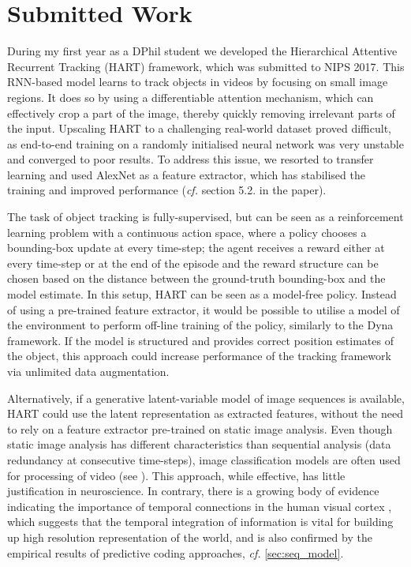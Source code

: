 \section{Submitted Work}
\label{sec:done}

    During my first year as a DPhil student we developed the Hierarchical Attentive Recurrent Tracking (HART) framework, which was submitted to NIPS 2017. 
    This RNN-based model learns to track objects in videos by focusing on small image regions. It does so by using a differentiable attention mechanism, which can effectively crop a part of the image, thereby quickly removing irrelevant parts of the input.
    Upscaling HART to a challenging real-world dataset proved difficult, as end-to-end training on a randomly initialised neural network was very unstable and converged to poor results. 
    To address this issue, we resorted to transfer learning and used AlexNet \citep{Krizhevsky2012} as a feature extractor, which has stabilised the training and improved performance (\emph{cf.} section 5.2. in the paper).
    
    The task of object tracking is fully-supervised, but can be seen as a reinforcement learning problem \citep{Zhang2017a} with a continuous action space, where a policy chooses a bounding-box update at every time-step; the agent receives a reward either at every time-step or at the end of the episode and the reward structure can be chosen based on the distance between the ground-truth bounding-box and the model estimate. In this setup, HART can be seen as a model-free policy. Instead of using a pre-trained feature extractor, it would be possible to utilise a model of the environment to perform off-line training of the policy, similarly to the Dyna framework. If the model is structured and provides correct position estimates of the object, this approach could increase performance of the tracking framework via unlimited data augmentation.
    
    Alternatively, if a generative latent-variable model of image sequences is available, HART could use the latent representation as extracted features, without the need to rely on a feature extractor pre-trained on static image analysis. Even though static image analysis has different characteristics than sequential analysis (\eg data redundancy at consecutive time-steps), image classification models are often used for processing of video (see \eg \cite{Ning2016a}). 
    This approach, while effective, has little justification in neuroscience. 
    In contrary, there is a growing body of evidence indicating the importance of temporal connections in the human visual cortex \citep{Ungerleider2000}, which suggests that the temporal integration of information is vital for building up high resolution representation of the world, and is also confirmed by the empirical results of predictive coding approaches, \emph{cf.} \cref{sec:seq_model}.
    
